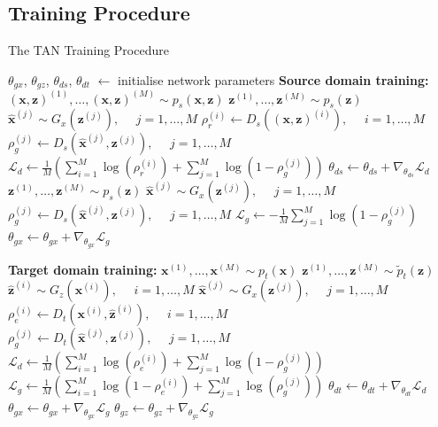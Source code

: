 \documentclass{article}
\begin{document}
\subsection{Training Procedure}

\begin{algorithm}[tb]
   \caption{The TAN Training Procedure}
   \label{alg:example}
\begin{algorithmic}
   \STATE $\theta_{gx}$, $\theta_{gz}$, $\theta_{ds}$, $\theta_{dt}$ $\leftarrow$ initialise network parameters
   \REPEAT
   	\STATE \textbf{Source domain training:}
   		\STATE $(\bm{x},\bm{z})^{(1)}, \dots, (\bm{x},\bm{z})^{(M)} \sim p_s(\bm{x},\bm{z})$ 
		\STATE $\bm{z}^{(1)}, \dots, \bm{z}^{(M)} \sim p_s(\bm{z})$
		\STATE $\hat{\bm{x}}^{(j)} \sim G_x \left(\bm{z}^{(j)}\right), \ \ \ \ \ \ j = 1, \dots, M $ 
		\STATE $\rho_r^{(i)} \leftarrow D_s\left((\bm{x},\bm{z})^{(i)}\right), \ \ \ \ \ \ i = 1, \dots, M $ 
		\STATE $\rho_g^{(j)} \leftarrow D_s\left(\hat{\bm{x}}^{(j)}, \bm{z}^{(j)}\right), \ \ \ \ \ \ j = 1, \dots, M $
		\STATE $\mathcal{L}_d \leftarrow \frac{1}{M} \left( \sum_{i=1}^{M} \log \left( \rho_r^{(i)} \right) + \sum_{j=1}^{M} \log \left( 1 - \rho_g^{(j)} \right) \right)$
		\STATE $\theta_{ds} \leftarrow \theta_{ds} + \nabla_{\theta_{ds}}\mathcal{L}_d$
	\ENDFOR
	\STATE $\bm{z}^{(1)}, \dots, \bm{z}^{(M)} \sim p_s(\bm{z})$
	\STATE $\hat{\bm{x}}^{(j)} \sim G_x \left(\bm{z}^{(j)}\right), \ \ \ \ \ \ j = 1, \dots, M $ 
	\STATE $\rho_g^{(j)} \leftarrow D_s\left(\hat{\bm{x}}^{(j)}, \bm{z}^{(j)}\right), \ \ \ \ \ \ j = 1, \dots, M $
	\STATE $\mathcal{L}_g \leftarrow -\frac{1}{M} \sum_{j=1}^{M} \log \left(1 - \rho_g^{(j)} \right)$
	\STATE $\theta_{gx} \leftarrow \theta_{gx} + \nabla_{\theta_{gx}}\mathcal{L}_g$
	
   	\STATE \textbf{Target domain training:}
   	\STATE $\bm{x}^{(1)}, \dots, \bm{x}^{(M)} \sim p_t(\bm{x})$ 
	\STATE $\bm{z}^{(1)}, \dots, \bm{z}^{(M)} \sim \widetilde{p}_t(\bm{z})$
	\STATE $\hat{\bm{z}}^{(i)} \sim G_z \left( \bm{x}^{(i)}\right), \ \ \ \ \ \ i = 1, \dots, M $ 
	\STATE $\hat{\bm{x}}^{(j)} \sim G_x \left( \bm{z}^{(j)}\right), \ \ \ \ \ \ j = 1, \dots, M $
	\STATE $\rho_e^{(i)} \leftarrow D_t(\bm{x}^{(i)}, \hat{\bm{z}}^{(i)}), \ \ \ \ \ \ i = 1, \dots, M $ 
	\STATE $\rho_g^{(j)} \leftarrow D_t(\hat{\bm{x}}^{(j)}, \bm{z}^{(j)}), \ \ \ \ \ \ j = 1, \dots, M $
	\STATE $\mathcal{L}_d \leftarrow \frac{1}{M} \left( \sum_{i=1}^{M} \log \left( \rho_e^{(i)} \right) + \sum_{j=1}^{M} \log \left( 1 - \rho_g^{(j)} \right) \right)$
	\STATE $\mathcal{L}_g \leftarrow \frac{1}{M} \left( \sum_{i=1}^{M} \log \left( 1 - \rho_e^{(i)} \right) + \sum_{j=1}^{M} \log \left(\rho_g^{(j)} \right) \right)$
	\STATE $\theta_{dt} \leftarrow \theta_{dt} + \nabla_{\theta_{dt}}\mathcal{L}_d$
	\STATE $\theta_{gx} \leftarrow \theta_{gx} + \nabla_{\theta_{gx}}\mathcal{L}_g$
	\STATE $\theta_{gz} \leftarrow \theta_{gz} + \nabla_{\theta_{gz}}\mathcal{L}_g$
\end{algorithmic}
\end{algorithm}
\end{document}
